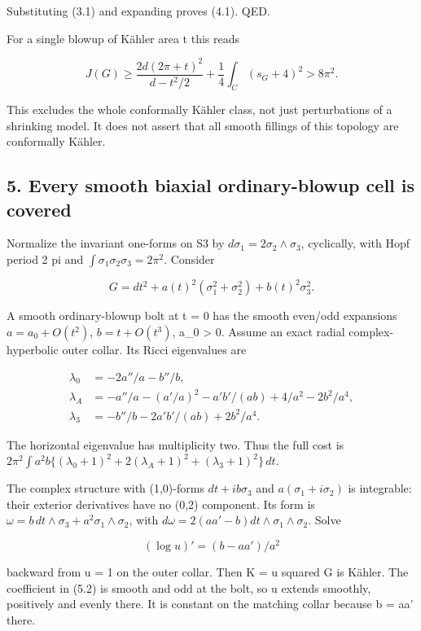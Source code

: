 \documentclass[
  10pt,
]{article}
\begin{document}
Substituting (3.1) and expanding proves (4.1). QED.

For a single blowup of Kähler area t this reads

\[
 J(G)\ge \frac{2d(2\pi+t)^2}{d-t^2/2}
                         +\frac14\int_C(s_G+4)^2>8\pi^2. \tag{4.2}
\]

This excludes the whole conformally Kähler class, not just perturbations
of a shrinking model. It does not assert that all smooth fillings of
this topology are conformally Kähler.

\hypertarget{every-smooth-biaxial-ordinary-blowup-cell-is-covered}{%
\subsection{5. Every smooth biaxial ordinary-blowup cell is
covered}\label{every-smooth-biaxial-ordinary-blowup-cell-is-covered}}

Normalize the invariant one-forms on S3 by
\(d\sigma_1=2\sigma_2\wedge\sigma_3\), cyclically, with Hopf period 2 pi
and \(\int\sigma_1\sigma_2\sigma_3=2\pi^2\). Consider

\[
 G=dt^2+a(t)^2(\sigma_1^2+\sigma_2^2)+b(t)^2\sigma_3^2.
\]

A smooth ordinary-blowup bolt at t = 0 has the smooth even/odd
expansions \(a=a_0+O(t^2)\), \(b=t+O(t^3)\), a\_0 \textgreater{} 0.
Assume an exact radial complex-hyperbolic outer collar. Its Ricci
eigenvalues are

\[
\begin{aligned}
 \lambda_0&=-2a''/a-b''/b,\\
 \lambda_A&=-a''/a-(a'/a)^2-a'b'/(ab)+4/a^2-2b^2/a^4,\\
 \lambda_3&=-b''/b-2a'b'/(ab)+2b^2/a^4.
\end{aligned}                                                    \tag{5.1}
\]

The horizontal eigenvalue has multiplicity two. Thus the full cost is
\(2\pi^2\int a^2b\{(\lambda_0+1)^2+2(\lambda_A+1)^2+ (\lambda_3+1)^2\}\,dt\).

The complex structure with (1,0)-forms \(dt+ib\sigma_3\) and
\(a(\sigma_1+i\sigma_2)\) is integrable: their exterior derivatives have
no (0,2) component. Its form is
\(\omega=b\,dt\wedge\sigma_3+a^2\sigma_1\wedge\sigma_2\), with
\(d\omega=2(aa'-b)dt\wedge\sigma_1\wedge\sigma_2\). Solve

\[
                 (\log u)'=(b-aa')/a^2                         \tag{5.2}
\]

backward from u = 1 on the outer collar. Then K = u squared G is Kähler.
The coefficient in (5.2) is smooth and odd at the bolt, so u extends
smoothly, positively and evenly there. It is constant on the matching
collar because b = aa' there.
\end{document}

